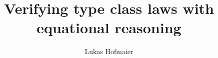 \documentclass[twoside, a4paper, x11names]{article}
\author{Lukas Hofmaier}
\title{Verifying type class laws with equational reasoning}
\begin{document}
\maketitle





\printglossary






\end{document}
